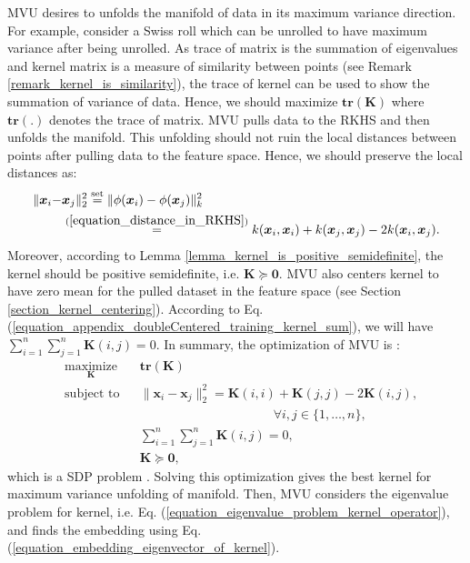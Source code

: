\documentclass[lang=cn,10pt]{gorgeousnbook}
\numberwithin{equation}{section}%
\numberwithin{figure}{section}%
\begin{document}
MVU desires to unfolds the manifold of data in its maximum variance direction. For example, consider a Swiss roll which can be unrolled to have maximum variance after being unrolled. As trace of matrix is the summation of eigenvalues and kernel matrix is a measure of similarity between points (see Remark \ref{remark_kernel_is_similarity}), the trace of kernel can be used to show the summation of variance of data. Hence, we should maximize $\textbf{tr}(\boldsymbol{K})$ where $\textbf{tr}(.)$ denotes the trace of matrix. 
MVU pulls data to the RKHS and then unfolds the manifold. This unfolding should not ruin the local distances between points after pulling data to the feature space. Hence, we should preserve the local distances as:
\begin{align}
\|\boldsymbol{x}_i - &\boldsymbol{x}_j\|_2^2 \overset{\text{set}}{=} \|\phi(\boldsymbol{x}_i) - \phi(\boldsymbol{x}_j)\|_k^2 \nonumber \\
&\overset{(\ref{equation_distance_in_RKHS})}{=} k(\boldsymbol{x}_i, \boldsymbol{x}_i) + k(\boldsymbol{x}_j, \boldsymbol{x}_j) - 2 k(\boldsymbol{x}_i, \boldsymbol{x}_j).
\end{align}
Moreover, according to Lemma \ref{lemma_kernel_is_positive_semidefinite}, the kernel should be positive semidefinite, i.e. $\boldsymbol{K} \succeq \boldsymbol{0}$. 
MVU also centers kernel to have zero mean for the pulled dataset in the feature space (see Section \ref{section_kernel_centering}). According to Eq. (\ref{equation_appendix_doubleCentered_training_kernel_sum}), we will have $\sum_{i=1}^n \sum_{j=1}^n \boldsymbol{K}(i,j) = 0$. In summary, the optimization of MVU is \cite{weinberger2005nonlinear,weinberger2006unsupervised,weinberger2006introduction}:
\begin{equation}
\begin{aligned}
& \underset{\boldsymbol{K}}{\text{maximize}}
& & \textbf{tr}(\boldsymbol{K}) \\
& \text{subject to}
& & \|\boldsymbol{x}_i - \boldsymbol{x}_j\|_2^2 = \boldsymbol{K}(i,i) + \boldsymbol{K}(j,j) - 2 \boldsymbol{K}(i,j), \\
& & & ~~~~~~~~~~\qquad\qquad\qquad\qquad \; \forall i,j \in \{1, \ldots, n\}, \\
& & & \sum_{i=1}^n \sum_{j=1}^n \boldsymbol{K}(i,j) = 0, \\
& & & \boldsymbol{K} \succeq \boldsymbol{0},
\end{aligned}
\end{equation}
which is a SDP problem \cite{vandenberghe1996semidefinite}. 
Solving this optimization gives the best kernel for maximum variance unfolding of manifold. Then, MVU considers the eigenvalue problem for kernel, i.e. Eq. (\ref{equation_eigenvalue_problem_kernel_operator}), and finds the embedding using Eq. (\ref{equation_embedding_eigenvector_of_kernel}).
\end{document}
